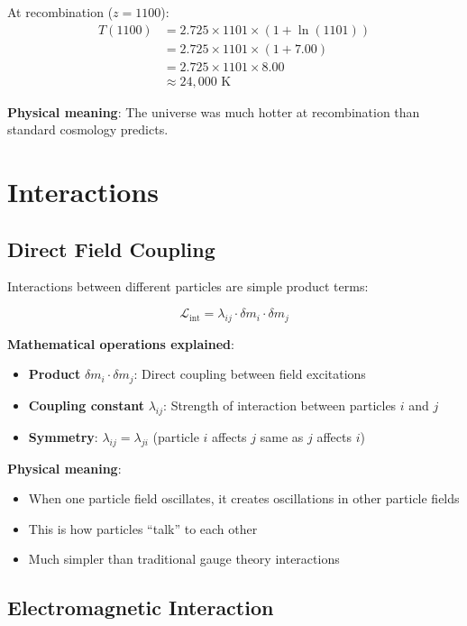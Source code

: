 \documentclass[12pt,a4paper]{article}
\newcommand{\deltam}{\delta m}
\newcommand{\Lag}{\mathcal{L}}
\theoremstyle{definition}
\theoremstyle{remark}
\begin{document}
	At recombination ($z = 1100$):
	\begin{align}
		T(1100) &= 2.725 \times 1101 \times (1 + \ln(1101)) \\
		&= 2.725 \times 1101 \times (1 + 7.00) \\
		&= 2.725 \times 1101 \times 8.00 \\
		&\approx 24{,}000 \text{ K}
	\end{align}
	
	\textbf{Physical meaning}: The universe was much hotter at recombination than standard cosmology predicts.
	
	\section{Interactions}
	
	\subsection{Direct Field Coupling}
	
	Interactions between different particles are simple product terms:
	
	\begin{equation}
		\Lag_{\text{int}} = \lambda_{ij} \cdot \deltam_i \cdot \deltam_j
		\label{eq:interaction_lagrangian}
	\end{equation}
	
	\textbf{Mathematical operations explained}:
	\begin{itemize}
		\item \textbf{Product} $\deltam_i \cdot \deltam_j$: Direct coupling between field excitations
		\item \textbf{Coupling constant} $\lambda_{ij}$: Strength of interaction between particles $i$ and $j$
		\item \textbf{Symmetry}: $\lambda_{ij} = \lambda_{ji}$ (particle $i$ affects $j$ same as $j$ affects $i$)
	\end{itemize}
	
	\textbf{Physical meaning}:
	\begin{itemize}
		\item When one particle field oscillates, it creates oscillations in other particle fields
		\item This is how particles ``talk'' to each other
		\item Much simpler than traditional gauge theory interactions
	\end{itemize}
	
	\subsection{Electromagnetic Interaction}
	
\end{document}

